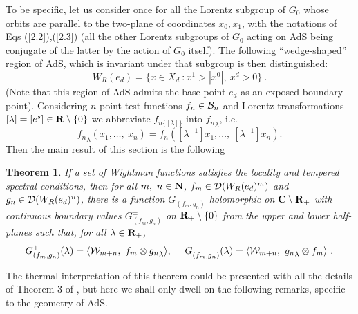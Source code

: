 \documentclass[a4paper,a4paper]{article}
\newtheorem{theorem}{Theorem}[section]
\def\bC{{\bf C}}
\def\bR{{\bf R}}
\def\bN{{\bf N}}
\def\BB{{\cal B}}
\def\DD{{\cal D}}
\def\WW{{\cal W}}
\begin{document}
\vskip 0.2cm
To be specific, let us consider once for all the Lorentz subgroup
of $G_0$ whose orbits are parallel to the two-plane of
coordinates $x_0, x_1$, with the notations of Eqs
(\ref{2.2}),(\ref{2.3}) (all the other Lorentz subgroups of $G_0$
acting on AdS being conjugate of the latter by the action of $G_0$
itself). The following ``wedge-shaped'' region of AdS, which is
invariant under that subgroup is then distinguished:
\begin{equation}
W_R(e_d) = \{x \in X_d\ : x^1 > |x^0|, \ x^d >0\}\ .
\label{wedgeshape}\end{equation}
(Note that this region of AdS admits the base point
$e_d$ as an exposed boundary point).
Considering $n$-point test-functions $f_n \in \BB_n$ and
Lorentz transformations $[\lambda] = [e^s] \in {\bf R}\setminus \{0\}$
we abbreviate
$f_{n\{[\lambda]\}}$ into ${f_{n}}_\lambda$, i.e.
\begin{equation}
{f_n}_\lambda(x_1,\ldots,\ x_n) =
f_n([\lambda^{-1}]x_1,\ldots,\ [\lambda^{-1}]x_n).
\label{5.9}\end{equation}
Then the main result of this section is the following
\begin{theorem}
\label{bw}
If a set of Wightman functions satisfies the locality and tempered
spectral conditions, then for all $m,\ n\in \bN$,
$f_m\in \DD(W_R(e_d)^m)$ and $g_n\in \DD(W_R(e_d)^n)$,
there is a function $G_{(f_m,g_n)}$ holomorphic on $\bC\setminus \bR_+$
with continuous boundary values $G_{(f_m,g_n)}^\pm$
on $\bR_+\setminus\{0\}$ from the upper and lower half-planes such that,
for all $\lambda \in \bR_+$,
\begin{equation}
G_{(f_m,g_n)}^+(\lambda) =
\langle\WW_{m+n},\ f_m\otimes {g_n}_\lambda\rangle,\ \ \ \
G_{(f_m,g_n)}^-(\lambda) =
\langle\WW_{m+n},\ {g_n}_\lambda\otimes f_m\rangle\ .
\label{5.11}\end{equation}
\end{theorem}
The thermal interpretation of this theorem could
be presented with all the details of Theorem 3 of \cite{BEM},
but here we shall only dwell on the following remarks,
specific to the geometry of AdS.
\end{document}
